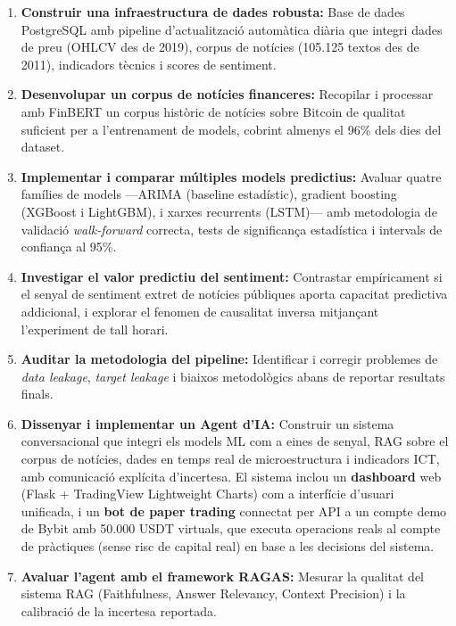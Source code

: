 \documentclass[12pt, a4paper]{report}
\begin{document}
\begin{enumerate}[leftmargin=*, label=\textbf{OE\arabic*.}]
  \item \textbf{Construir una infraestructura de dades robusta:} Base de dades PostgreSQL amb pipeline d'actualització automàtica diària que integri dades de preu (OHLCV des de 2019), corpus de notícies (105.125 textos des de 2011), indicadors tècnics i scores de sentiment.

  \item \textbf{Desenvolupar un corpus de notícies financeres:} Recopilar i processar amb FinBERT un corpus històric de notícies sobre Bitcoin de qualitat suficient per a l'entrenament de models, cobrint almenys el 96\% dels dies del dataset.

  \item \textbf{Implementar i comparar múltiples models predictius:} Avaluar quatre famílies de models ---ARIMA (baseline estadístic), gradient boosting (XGBoost i LightGBM), i xarxes recurrents (LSTM)--- amb metodologia de validació \textit{walk-forward} correcta, tests de significança estadística i intervals de confiança al 95\%.

  \item \textbf{Investigar el valor predictiu del sentiment:} Contrastar empíricament si el senyal de sentiment extret de notícies públiques aporta capacitat predictiva addicional, i explorar el fenomen de causalitat inversa mitjançant l'experiment de tall horari.

  \item \textbf{Auditar la metodologia del pipeline:} Identificar i corregir problemes de \textit{data leakage}, \textit{target leakage} i biaixos metodològics abans de reportar resultats finals.

  \item \textbf{Dissenyar i implementar un Agent d'IA:} Construir un sistema conversacional que integri els models ML com a eines de senyal, RAG sobre el corpus de notícies, dades en temps real de microestructura i indicadors ICT, amb comunicació explícita d'incertesa. El sistema inclou un \textbf{dashboard} web (Flask + TradingView Lightweight Charts) com a interfície d'usuari unificada, i un \textbf{bot de paper trading} connectat per API a un compte demo de Bybit amb 50.000 USDT virtuals, que executa operacions reals al compte de pràctiques (sense risc de capital real) en base a les decisions del sistema.

  \item \textbf{Avaluar l'agent amb el framework RAGAS:} Mesurar la qualitat del sistema RAG (Faithfulness, Answer Relevancy, Context Precision) i la calibració de la incertesa reportada.
\end{enumerate}
\end{document}
